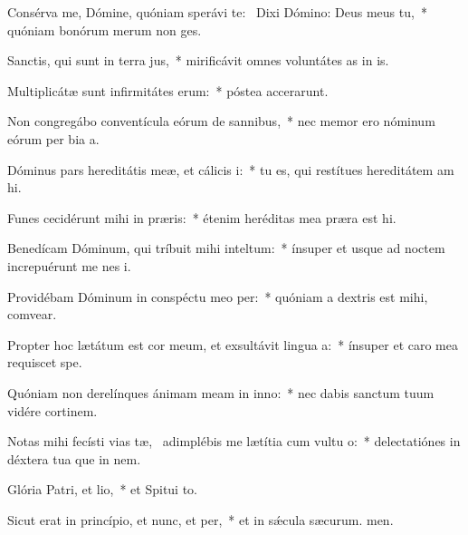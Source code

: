 \item Consérva me, Dómine, quóniam sperávi  te:~\pscross{} Dixi Dómino: Deus meus  tu,~* quóniam bonórum merum non ges.
\item Sanctis, qui sunt in terra jus,~* mirificávit omnes voluntátes as in is.
\item Multiplicátæ sunt infirmitátes erum:~* póstea accerarunt.
\item Non congregábo conventícula eórum de sannibus,~* nec memor ero nóminum eórum per bia a.
\item Dóminus pars hereditátis meæ, et cálicis i:~* tu es, qui restítues hereditátem am hi.
\item Funes cecidérunt mihi in præris:~* étenim heréditas mea præra est hi.
\item Benedícam Dóminum, qui tríbuit mihi inteltum:~* ínsuper et usque ad noctem increpuérunt me nes i.
\item Providébam Dóminum in conspéctu meo per:~* quóniam a dextris est mihi,  comvear.
\item Propter hoc lætátum est cor meum, et exsultávit lingua a:~* ínsuper et caro mea requiscet  spe.
\item Quóniam non derelínques ánimam meam in inno:~* nec dabis sanctum tuum vidére cortinem.
\item Notas mihi fecísti vias tæ,~\pscross{} adimplébis me lætítia cum vultu o:~* delectatiónes in déxtera tua que in nem.
\item Glória Patri, et lio,~* et Spitui to.
\item Sicut erat in princípio, et nunc, et per,~* et in sǽcula sæcurum. men.
